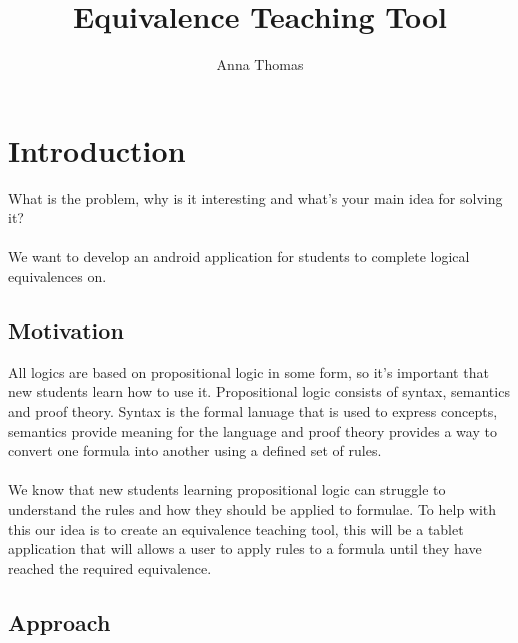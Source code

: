 \documentclass{report}
\begin{document}
 

\title{Equivalence Teaching Tool} 
\author{Anna Thomas} 

\maketitle 

\tableofcontents 

\chapter{Introduction} 

What is the problem, why is it interesting and what’s your main idea for solving it?
\\\\
We want to develop an android application for students to complete logical equivalences on. 

\section{Motivation} 
All logics are based on propositional logic in some form, so it's important that new students learn how to use it. Propositional logic consists of syntax, semantics and proof theory. Syntax is the formal lanuage that is used to express concepts, semantics provide meaning for the language and proof theory provides a way to convert one formula into another using a defined set of rules.
\\\\
We know that new students learning propositional logic can struggle to understand the rules and how they should be applied to formulae. To help with this our idea is to create an equivalence teaching tool, this will be a tablet application that will allows a user to apply rules to a formula until they have reached the required equivalence.

\section{Approach}
\end{document}
